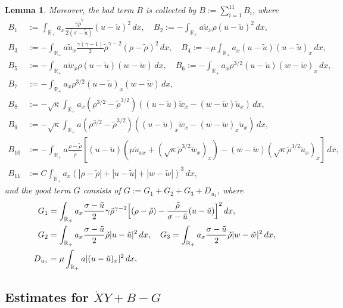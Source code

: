 \documentclass[11pt,reqno]{amsart}
\newtheorem{lemma}{Lemma}[section]
\numberwithin{equation}{section} %
\begin{document}
\begin{lemma}
Moreover, the bad term $B$ is collected by $B := \sum_{i=1}^{11} B_i$, where
\begin{align*}
	B_1&:=\int_{\mathbb{R}_+} a_x\frac{\gamma\tilde{\rho}^{\gamma}}{2(\sigma-\tilde{u})}(u-\tilde{u})^2\,dx, \quad B_2:=-\int_{\mathbb{R}_+}a\tilde{u}_x\rho(u-\tilde{u})^2\,dx,\\
	B_3&:=-\int_{\mathbb{R}_+}a\tilde{u}_x\frac{\gamma(\gamma-1)}{2}\tilde{\rho}^{\gamma-2}(\rho-\tilde{\rho})^2\,dx, \quad B_4:=-\mu\int_{\mathbb{R}_+}a_x(u-\tilde{u})(u-\tilde{u})_x\,dx,\\
	B_5&:=-\int_{\mathbb{R}_+}a\tilde{w}_x\rho(u-\tilde{u})(w-\tilde{w})\,dx, \quad B_6:=-\int_{\mathbb{R}_+}a_x\rho^{3/2}(u-\tilde{u})(w-\tilde{w})_x\,dx,\\
	B_7&:=-\int_{\mathbb{R}_+}a_x\rho^{3/2}(u-\tilde{u})_x(w-\tilde{w})\,dx,\\
	B_8&:=-\sqrt{\kappa}\int_{\mathbb{R}_+}a_x(\rho^{3/2}-\tilde{\rho}^{3/2})((u-\tilde{u})\tilde{w}_x-(w-\tilde{w})\tilde{u}_x)\,dx,\\
	B_9&:=-\sqrt{\kappa}\int_{\mathbb{R}_+}a(\rho^{3/2}-\tilde{\rho}^{3/2})((u-\tilde{u})_x\tilde{w}_x-(w-\tilde{w})_x\tilde{u}_x)\,dx,\\
	B_{10}&:=-\int_{\mathbb{R}_+}a\frac{\rho-\tilde{\rho}}{\tilde{\rho}}\left[(u-\tilde{u})\left(\mu\tilde{u}_{xx}+(\sqrt{\kappa}\tilde{\rho}^{3/2}\tilde{w}_x)_x\right)-(w-\tilde{w})(\sqrt{\kappa}\tilde{\rho}^{3/2}\tilde{u}_x)_x\right]\,dx,\\
	B_{11}&:=C\int_{\mathbb{R}_+}a_x\left(|\rho-\tilde{\rho}|+|u-\tilde{u}|+|w-\tilde{w}|\right)^3\,dx,
\end{align*}
and the good term $G$ consists of $G := G_1 + G_2 + G_3 + D_{u_1}$, where
\begin{align*}
	G_1 &= \int_{\mathbb{R}_+}a_x\frac{\sigma-\tilde{u}}{2}\gamma\tilde{\rho}^{\gamma-2}\Bigl[(\rho-\tilde{\rho})-\frac{\tilde{\rho}}{\sigma-\tilde{u}}(u-\tilde{u})\Bigr]^2\,dx,\\
	G_2&=\int_{\mathbb{R}_+}a_x \frac{\sigma-\tilde{u}}{2}\tilde{\rho}|u-\tilde{u}|^2\,dx,\quad G_3=\int_{\mathbb{R}_+}a_x\frac{\sigma-\tilde{u}}{2}\tilde{\rho}|w-\tilde{w}|^2\,dx,\\
	D_{u_1}&=\mu\int_{\mathbb{R}_+}a|(u-\tilde{u})_x|^2\,dx.
\end{align*}
\end{lemma}

\subsection{Estimates for \texorpdfstring{$\dot{X}Y+B-G$}{X-dot Y + B - G}}
\end{document}
